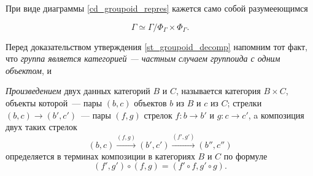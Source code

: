     При виде диаграммы \ref{cd_groupoid_repres} кажется само собой разумееющимся
    \begin{statement}\label{st_groupoid_decomp}
        \begin{equation}
            \Gamma \simeq \textstyle{\Gamma / \Phi_\Gamma \times \Phi_\Gamma}.
        \end{equation}
    \end{statement}

    Перед доказательством утверждения \ref{st_groupoid_decomp} напомним тот 
    факт, что \emph{группа является категорией --- частным случаем группоида с одним 
    объектом}, и 
    \begin{definition}\cite{MacLane}
        \emph{Произведением} двух данных категорий $B$ и $C$, называется 
        категория $B \times C$, объекты которой~--- пары $(b,c)$ объектов $b$ из 
        $B$ и $c$ из $C$; стрелки $(b,c) \to (b',c')$~--- пары $(f,g)$ стрелок 
        $f : b \to b'$ и $g : c \to c'$, a композиция двух таких стрелок
        \[(b,c) \stackrel{(f,g)}{\longrightarrow} (b',c') \stackrel{(f',g')}{\longrightarrow} (b'',c'')\]
        определяется в терминах композиции в категориях $B$ и $C$ по формуле
        \[(f',g') \circ (f,g) = (f' \circ f, g' \circ g).\]
    \end{definition}


